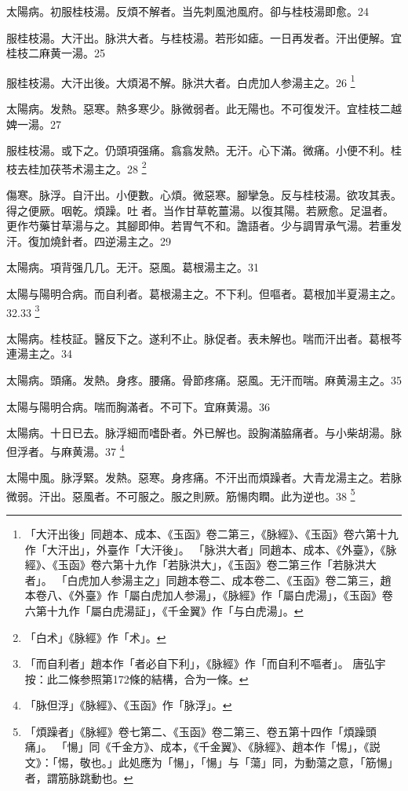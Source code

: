太陽病。初服桂枝湯。反煩不解者。当先刺風池風府。卻与桂枝湯即愈。24

服桂枝湯。大汗出。脉洪大者。与桂枝湯。若形如瘧。一日再发者。汗出便解。宜桂枝二麻黄一湯。25

%

服桂枝湯。大汗出{\khaai 後}。大煩渴不解。脉洪大者。白虎{\khaai 加人参}湯主之。26
	\footnote{
		「大汗出後」同趙本、成本、《玉函》卷二第三，《脉經》、《玉函》卷六第十九作「大汗出」，外臺作「大汗後」。
		「脉洪大者」同趙本、成本、《外臺》，《脉經》、《玉函》卷六第十九作「若脉洪大」，《玉函》卷二第三作「若脉洪大者」。
		「白虎加人参湯主之」同趙本卷二、成本卷二、《玉函》卷二第三，趙本卷八、《外臺》作「屬白虎加人参湯」，《脉經》作「屬白虎湯」，《玉函》卷六第十九作「屬白虎湯証」，《千金翼》作「与白虎湯」。
	}

太陽病。发熱。惡寒。熱多寒少。脉微弱者。此无陽也。不可{\khaai 復}发汗。{\khaai 宜桂枝二越婢一湯。}27

服桂枝湯。{\khaai 或}下之。仍頭項强痛。翕翕发熱。无汗。心下滿。微痛。小便不利。桂枝去桂加茯苓术湯主之。28
	\footnote{
		「白术」《脉經》作「术」。
	}

傷寒。脉浮。自汗出。小便數。心煩。微惡寒。腳攣急。反与桂枝湯。欲攻其表。得之便厥。咽乾。煩躁。吐{\sungii 𠱘}者。当作甘草乾薑湯。以復其陽。若厥愈。足温者。更作芍藥甘草湯与之。其腳即伸。若胃气不和。譫語者。少与{\khaai 調胃}承气湯。若重发汗。復加燒針者。四逆湯主之。29

太陽病。項背强几几。无汗。惡風。葛根湯主之。31

太陽与陽明合病。而自利{\khaai 者}。葛根湯主之。不下利。但嘔者。葛根加半夏湯主之。32.33
	\footnote{
		「而自利者」趙本作「者必自下利」，《脉經》作「而自利不嘔者」。
		唐弘宇按：此二條参照第172條的結構，合为一條。
	}

太陽病。桂枝証。醫反下之。遂利不止。脉促者。表未解也。喘而汗出者。葛根芩連湯主之。34

太陽病。頭痛。发熱。身疼。腰痛。骨節疼痛。惡風。无汗而喘。麻黄湯主之。35

太陽与陽明合病。喘而胸滿者。不可下。宜麻黄湯。36

太陽病。十日已去。脉浮細而嗜卧者。外已解也。設胸滿脇痛者。与小柴胡湯。脉{\khaai 但}浮者。与麻黄湯。37
	\footnote{
		「脉但浮」《脉經》、《玉函》作「脉浮」。
	}

太陽中風。脉浮緊。发熱。惡寒。身疼痛。不汗出而煩躁者。大青龙湯主之。若脉微弱。汗出。惡風者。不可服之。服之則厥。筋愓肉瞤。此为逆也。38
	\footnote{
		「煩躁者」《脉經》卷七第二、《玉函》卷二第三、卷五第十四作「煩躁頭痛」。
		「愓」同《千金方》、成本，《千金翼》、《脉經》、趙本作「惕」，《説文》：「惕，敬也。」此処應为「愓」，「愓」与「蕩」同，为動蕩之意，「筋愓」者，謂筋脉跳動也。
	}

